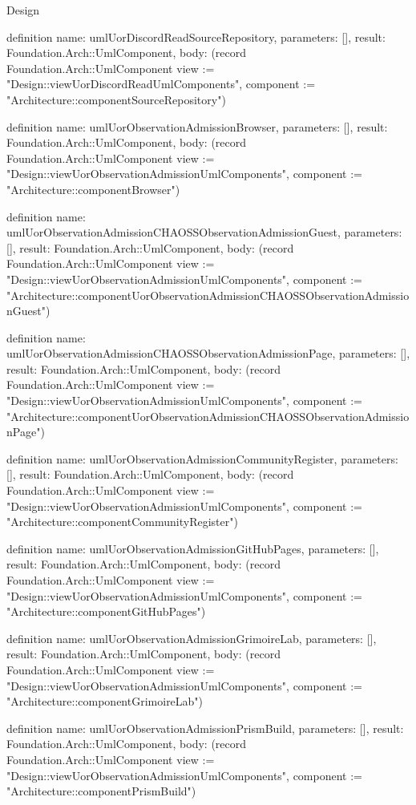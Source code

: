 \begin{lexlean}{Design}
\begin{semanticmodule}
definition{
  name: umlUorDiscordReadSourceRepository,
  parameters: [],
  result: Foundation.Arch::UmlComponent,
  body: (record Foundation.Arch::UmlComponent {view := "Design::viewUorDiscordReadUmlComponents", component := "Architecture::componentSourceRepository"})
}

definition{
  name: umlUorObservationAdmissionBrowser,
  parameters: [],
  result: Foundation.Arch::UmlComponent,
  body: (record Foundation.Arch::UmlComponent {view := "Design::viewUorObservationAdmissionUmlComponents", component := "Architecture::componentBrowser"})
}

definition{
  name: umlUorObservationAdmissionCHAOSSObservationAdmissionGuest,
  parameters: [],
  result: Foundation.Arch::UmlComponent,
  body: (record Foundation.Arch::UmlComponent {view := "Design::viewUorObservationAdmissionUmlComponents", component := "Architecture::componentUorObservationAdmissionCHAOSSObservationAdmissionGuest"})
}

definition{
  name: umlUorObservationAdmissionCHAOSSObservationAdmissionPage,
  parameters: [],
  result: Foundation.Arch::UmlComponent,
  body: (record Foundation.Arch::UmlComponent {view := "Design::viewUorObservationAdmissionUmlComponents", component := "Architecture::componentUorObservationAdmissionCHAOSSObservationAdmissionPage"})
}

definition{
  name: umlUorObservationAdmissionCommunityRegister,
  parameters: [],
  result: Foundation.Arch::UmlComponent,
  body: (record Foundation.Arch::UmlComponent {view := "Design::viewUorObservationAdmissionUmlComponents", component := "Architecture::componentCommunityRegister"})
}

definition{
  name: umlUorObservationAdmissionGitHubPages,
  parameters: [],
  result: Foundation.Arch::UmlComponent,
  body: (record Foundation.Arch::UmlComponent {view := "Design::viewUorObservationAdmissionUmlComponents", component := "Architecture::componentGitHubPages"})
}

definition{
  name: umlUorObservationAdmissionGrimoireLab,
  parameters: [],
  result: Foundation.Arch::UmlComponent,
  body: (record Foundation.Arch::UmlComponent {view := "Design::viewUorObservationAdmissionUmlComponents", component := "Architecture::componentGrimoireLab"})
}

definition{
  name: umlUorObservationAdmissionPrismBuild,
  parameters: [],
  result: Foundation.Arch::UmlComponent,
  body: (record Foundation.Arch::UmlComponent {view := "Design::viewUorObservationAdmissionUmlComponents", component := "Architecture::componentPrismBuild"})
}


\end{semanticmodule}
\end{lexlean}
